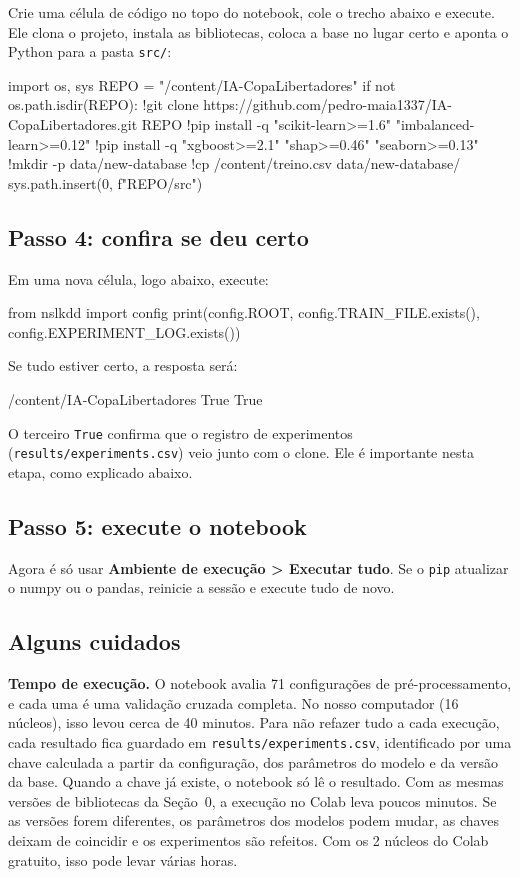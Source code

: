\documentclass[11pt,a4paper]{article}
\begin{document}
Crie uma célula de código no topo do notebook, cole o trecho abaixo e execute. Ele clona o projeto, instala as bibliotecas, coloca a base no lugar certo e aponta o Python para a pasta \texttt{src/}:

\begin{codigo}
import os, sys
REPO = "/content/IA-CopaLibertadores"
if not os.path.isdir(REPO):
    !git clone https://github.com/pedro-maia1337/IA-CopaLibertadores.git {REPO}
!pip install -q "scikit-learn>=1.6" "imbalanced-learn>=0.12"
!pip install -q "xgboost>=2.1" "shap>=0.46" "seaborn>=0.13"
!mkdir -p data/new-database
!cp /content/treino.csv data/new-database/
sys.path.insert(0, f"{REPO}/src")
\end{codigo}

\subsection*{Passo 4: confira se deu certo}

Em uma nova célula, logo abaixo, execute:

\begin{codigo}
from nslkdd import config
print(config.ROOT, config.TRAIN_FILE.exists(), config.EXPERIMENT_LOG.exists())
\end{codigo}

Se tudo estiver certo, a resposta será:

\begin{saida}
/content/IA-CopaLibertadores True True
\end{saida}

O terceiro \texttt{True} confirma que o registro de experimentos (\texttt{results/experiments.csv}) veio junto com o clone. Ele é importante nesta etapa, como explicado abaixo.

\subsection*{Passo 5: execute o notebook}

Agora é só usar \textbf{Ambiente de execução > Executar tudo}. Se o \texttt{pip} atualizar o numpy ou o pandas, reinicie a sessão e execute tudo de novo.

\subsection*{Alguns cuidados}

\textbf{Tempo de execução.} O notebook avalia 71 configurações de pré-processamento, e cada uma é uma validação cruzada completa. No nosso computador (16 núcleos), isso levou cerca de 40 minutos. Para não refazer tudo a cada execução, cada resultado fica guardado em \texttt{results/experiments.csv}, identificado por uma chave calculada a partir da configuração, dos parâmetros do modelo e da versão da base. Quando a chave já existe, o notebook só lê o resultado. Com as mesmas versões de bibliotecas da Seção~0, a execução no Colab leva poucos minutos. Se as versões forem diferentes, os parâmetros dos modelos podem mudar, as chaves deixam de coincidir e os experimentos são refeitos. Com os 2 núcleos do Colab gratuito, isso pode levar várias horas.
\end{document}
